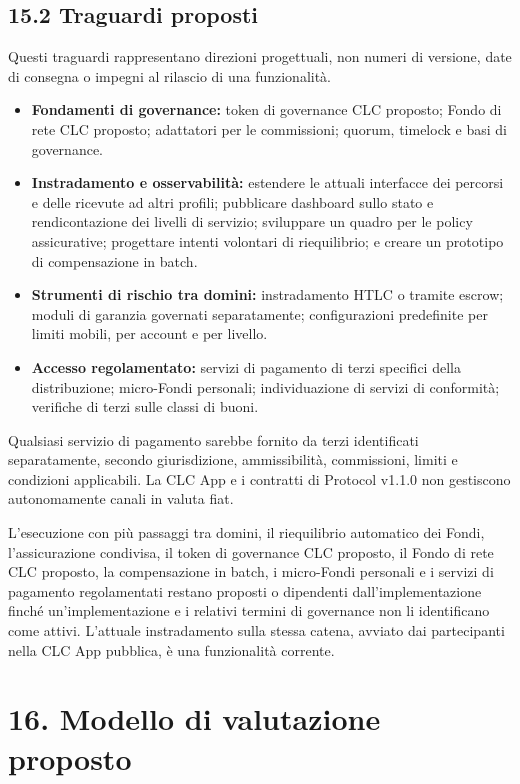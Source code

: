 \documentclass[11pt]{article}
\begin{document}
\subsection*{15.2 Traguardi proposti}

Questi traguardi rappresentano direzioni progettuali, non numeri di versione, date di consegna o impegni al rilascio di una funzionalità.

\begin{itemize}[leftmargin=*]
\item \textbf{Fondamenti di governance:} token di governance CLC proposto; Fondo di rete CLC proposto; adattatori per le commissioni; quorum, timelock e basi di governance.
\item \textbf{Instradamento e osservabilità:} estendere le attuali interfacce dei percorsi e delle ricevute ad altri profili; pubblicare dashboard sullo stato e rendicontazione dei livelli di servizio; sviluppare un quadro per le policy assicurative; progettare intenti volontari di riequilibrio; e creare un prototipo di compensazione in batch.
\item \textbf{Strumenti di rischio tra domini:} instradamento HTLC o tramite escrow; moduli di garanzia governati separatamente; configurazioni predefinite per limiti mobili, per account e per livello.
\item \textbf{Accesso regolamentato:} servizi di pagamento di terzi specifici della distribuzione; micro-Fondi personali; individuazione di servizi di conformità; verifiche di terzi sulle classi di buoni.
\end{itemize}
Qualsiasi servizio di pagamento sarebbe fornito da terzi identificati separatamente, secondo giurisdizione, ammissibilità, commissioni, limiti e condizioni applicabili. La CLC App e i contratti di Protocol v1.1.0 non gestiscono autonomamente canali in valuta fiat.

L'esecuzione con più passaggi tra domini, il riequilibrio automatico dei Fondi, l'assicurazione condivisa, il token di governance CLC proposto, il Fondo di rete CLC proposto, la compensazione in batch, i micro-Fondi personali e i servizi di pagamento regolamentati restano proposti o dipendenti dall'implementazione finché un'implementazione e i relativi termini di governance non li identificano come attivi. L'attuale instradamento sulla stessa catena, avviato dai partecipanti nella CLC App pubblica, è una funzionalità corrente.


\section*{16. Modello di valutazione proposto}
\end{document}
